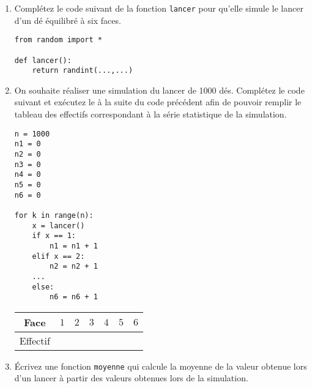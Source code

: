 \begin{exercise}
	\begin{enumerate}
		\item Complétez le code suivant de la fonction \texttt{lancer} pour qu'elle simule le lancer d'un dé équilibré à six faces.
		\begin{center}
			\begin{varwidth}[t]{.5\textwidth}
				\begin{lstlisting}[language=iPython,linewidth = 8cm]
from random import *

def lancer():
    return randint(...,...)
\end{lstlisting}\end{varwidth}\end{center}
		\item On souhaite réaliser une simulation du lancer de 1000 dés. Complétez le code suivant et exécutez le à la suite du code précédent afin de pouvoir remplir le tableau des effectifs correspondant à la série statistique de la simulation.
		\begin{center}
			\begin{varwidth}[t]{.5\textwidth}
				\begin{lstlisting}[language=iPython,linewidth = 6cm]
n = 1000
n1 = 0
n2 = 0
n3 = 0
n4 = 0
n5 = 0
n6 = 0

for k in range(n):
    x = lancer()
    if x == 1:
        n1 = n1 + 1
    elif x == 2:
        n2 = n2 + 1
    ...
    else:
        n6 = n6 + 1
\end{lstlisting}\end{varwidth}\end{center}
		\begin{center}
			\begin{tabular}{|c|C{1cm}|C{1cm}|C{1cm}|C{1cm}|C{1cm}|C{1cm}|}
				\hline
				Face & $1$ & $2$ & $3$ & $4$ & $5$ & $6$\\\hline
				Effectif & &  &  &  &  &  \\\hline
			\end{tabular}
		\end{center}
		\item Écrivez une fonction \texttt{moyenne} qui calcule la moyenne de la valeur obtenue lors d'un lancer à partir des valeurs obtenues lors de la simulation.
	\end{enumerate}
\end{exercise}


